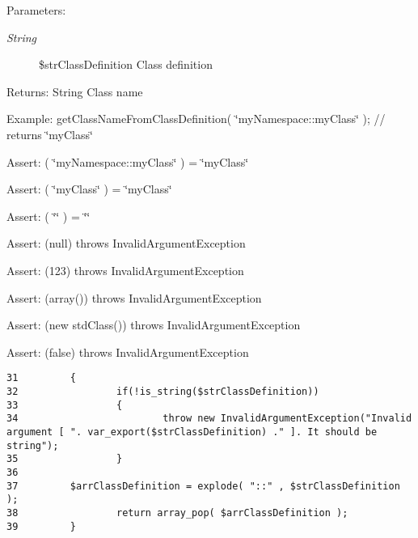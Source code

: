\begin{Desc}
\item[Parameters:]
\begin{description}
\item[{\em String}]\$strClassDefinition Class definition \end{description}
\end{Desc}
\begin{Desc}
\item[Returns:]String Class name \end{Desc}
\begin{Desc}
\item[Example:]getClassNameFromClassDefinition( \char`\"{}myNamespace::myClass\char`\"{} ); // returns \char`\"{}myClass\char`\"{}\end{Desc}
\begin{Desc}
\item[Assert:]( \char`\"{}myNamespace::myClass\char`\"{} ) = \char`\"{}myClass\char`\"{} \end{Desc}
\begin{Desc}
\item[Assert:]( \char`\"{}myClass\char`\"{} ) = \char`\"{}myClass\char`\"{} \end{Desc}
\begin{Desc}
\item[Assert:]( \char`\"{}\char`\"{} ) = \char`\"{}\char`\"{}\end{Desc}
\begin{Desc}
\item[Assert:](null) throws InvalidArgumentException \end{Desc}
\begin{Desc}
\item[Assert:](123) throws InvalidArgumentException \end{Desc}
\begin{Desc}
\item[Assert:](array()) throws InvalidArgumentException \end{Desc}
\begin{Desc}
\item[Assert:](new stdClass()) throws InvalidArgumentException \end{Desc}
\begin{Desc}
\item[Assert:](false) throws InvalidArgumentException \end{Desc}


\begin{Code}\begin{verbatim}31         {
32                 if(!is_string($strClassDefinition))
33                 {
34                         throw new InvalidArgumentException("Invalid argument [ ". var_export($strClassDefinition) ." ]. It should be string");
35                 }
36 
37         $arrClassDefinition = explode( "::" , $strClassDefinition );
38                 return array_pop( $arrClassDefinition );
39         }
\end{verbatim}
\end{Code}


